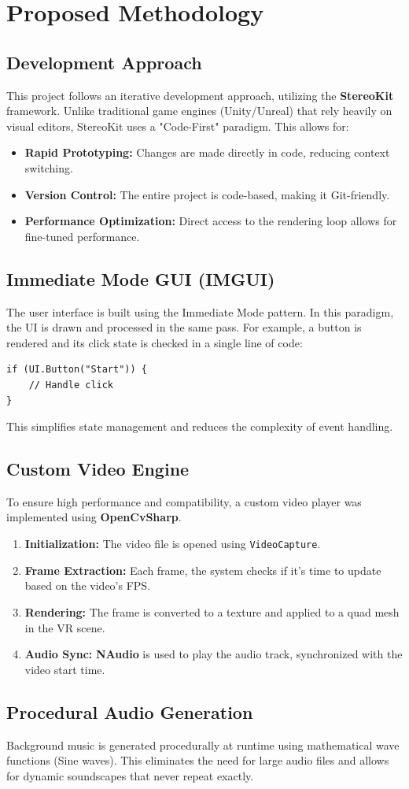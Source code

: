 \chapter{Proposed Methodology}

\section{Development Approach}
This project follows an iterative development approach, utilizing the \textbf{StereoKit} framework. Unlike traditional game engines (Unity/Unreal) that rely heavily on visual editors, StereoKit uses a "Code-First" paradigm. This allows for:
\begin{itemize}
    \item \textbf{Rapid Prototyping:} Changes are made directly in code, reducing context switching.
    \item \textbf{Version Control:} The entire project is code-based, making it Git-friendly.
    \item \textbf{Performance Optimization:} Direct access to the rendering loop allows for fine-tuned performance.
\end{itemize}

\section{Immediate Mode GUI (IMGUI)}
The user interface is built using the Immediate Mode pattern. In this paradigm, the UI is drawn and processed in the same pass. For example, a button is rendered and its click state is checked in a single line of code:
\begin{verbatim}
if (UI.Button("Start")) {
    // Handle click
}
\end{verbatim}
This simplifies state management and reduces the complexity of event handling.

\section{Custom Video Engine}
To ensure high performance and compatibility, a custom video player was implemented using \textbf{OpenCvSharp}.
\begin{enumerate}
    \item \textbf{Initialization:} The video file is opened using \texttt{VideoCapture}.
    \item \textbf{Frame Extraction:} Each frame, the system checks if it's time to update based on the video's FPS.
    \item \textbf{Rendering:} The frame is converted to a texture and applied to a quad mesh in the VR scene.
    \item \textbf{Audio Sync:} \textbf{NAudio} is used to play the audio track, synchronized with the video start time.
\end{enumerate}

\section{Procedural Audio Generation}
Background music is generated procedurally at runtime using mathematical wave functions (Sine waves). This eliminates the need for large audio files and allows for dynamic soundscapes that never repeat exactly.
